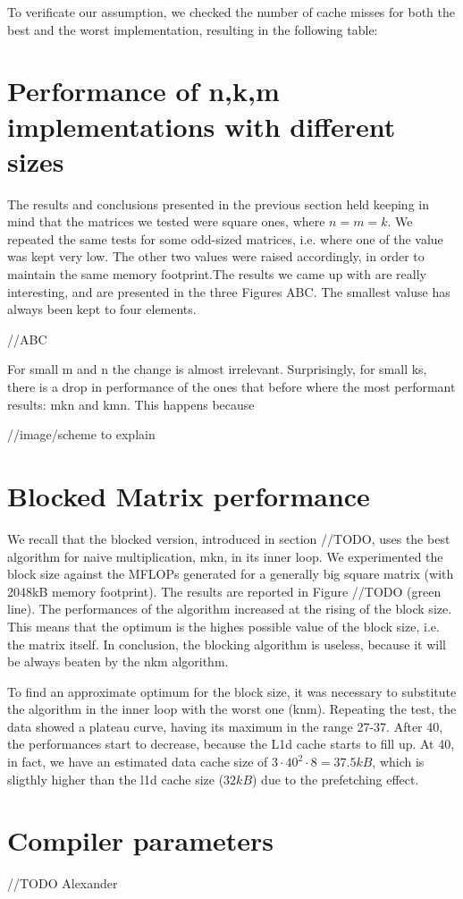 To verificate our assumption, we checked the number of cache misses for both the best and the worst implementation, resulting in the following table:

\section{Performance of n,k,m implementations with different sizes}
The results and conclusions presented in the previous section held keeping in mind that the matrices we tested were square ones, where $n=m=k$. We repeated the same tests for some odd-sized matrices, i.e. where one of the value was kept very low. The other two values were raised accordingly, in order to maintain the same memory footprint.The results we came up with are really interesting, and are presented in the three Figures ABC. The smallest valuse has always been kept to four elements.

//ABC

For small m and n the change is almost irrelevant. Surprisingly, for small ks, there is a drop in performance of the ones that before where the most performant results: mkn and kmn. This happens because 

//image/scheme to explain

\section{Blocked Matrix performance}
We recall that the blocked version, introduced in section //TODO, uses the best algorithm for naive multiplication, mkn, in its inner loop. We experimented the block size against the MFLOPs generated for a generally big square matrix (with 2048kB memory footprint). The results are reported in Figure //TODO (green line). The performances of the algorithm increased at the rising of the block size. This means that the optimum is the highes possible value of the block size, i.e. the matrix itself. In conclusion, the blocking algorithm is useless, because it will be always beaten by the nkm algorithm. 

To find an approximate optimum for the block size, it was necessary to substitute the algorithm in the inner loop with the worst one (knm). Repeating the test, the data showed a plateau curve, having its maximum in the range 27-37. After 40, the performances start to decrease, because the L1d cache starts to fill up. At 40, in fact, we have an estimated data cache size of $3 \cdot 40^2 \cdot 8 = 37.5kB$, which is sligthly higher than the l1d cache size ($32kB$) due to the prefetching effect.  

\section{Compiler parameters}

//TODO Alexander



